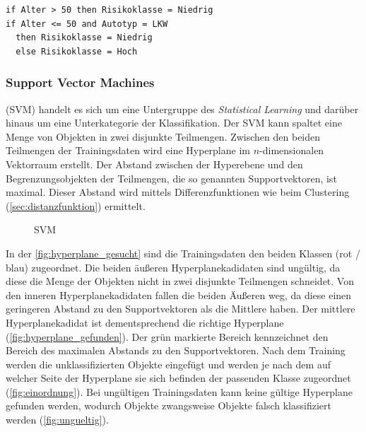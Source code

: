 \documentclass[12pt,journal,compsoc,ngerman]{IEEEtran}
\begin{document}
\begin{lstlisting}[caption={Entscheidungsbaum},label=list:dt,frame=single,floatplacement=t]
if Alter > 50 then Risikoklasse = Niedrig
if Alter <= 50 and Autotyp = LKW 
  then Risikoklasse = Niedrig
  else Risikoklasse = Hoch
\end{lstlisting}

\subsubsection{Support Vector Machines}
 (SVM) handelt es sich um eine Untergruppe des \emph{Statistical Learning} und darüber hinaus um eine Unterkategorie der Klassifikation. Der SVM kann spaltet eine Menge von Objekten in zwei disjunkte Teilmengen. Zwischen den beiden Teilmengen der Trainingsdaten wird eine Hyperplane im $n$-dimensionalen Vektorraum erstellt. Der Abstand zwischen der Hyperebene und den Begrenzungsobjekten der Teilmengen, die so genannten Supportvektoren, ist maximal. Dieser Abstand wird mittels Differenzfunktionen wie beim Clustering (\cref{sec:distanzfunktion}) ermittelt.

\begin{figure}[!t]
\centering
\subfigure[Gesucht]{\scalebox{0.42}{}\label{fig:hyperplane_gesucht}}
\subfigure[Gefunden]{\scalebox{0.42}{}\label{fig:hyperplane_gefunden}}
\subfigure[Einordnung]{\scalebox{0.49}{}\label{fig:einordnung}}
\caption{SVM}
\label{fig:svm}
\end{figure}

In der \cref{fig:hyperplane_gesucht} sind die Trainingsdaten den beiden Klassen (rot / blau) zugeordnet. Die beiden äußeren Hyperplanekadidaten sind ungültig, da diese die Menge der Objekten nicht in zwei disjunkte Teilmengen schneidet. Von den inneren Hyperplanekadidaten fallen die beiden Äußeren weg, da diese einen geringeren Abstand zu den Supportvektoren als die Mittlere haben. Der mittlere Hyperplanekadidat ist dementsprechend die richtige Hyperplane (\cref{fig:hyperplane_gefunden}). Der grün markierte Bereich kennzeichnet den Bereich des maximalen Abstands zu den Supportvektoren. Nach dem Training werden die unklassifizierten Objekte eingefügt und werden je nach dem auf welcher Seite der Hyperplane sie sich befinden der passenden Klasse zugeordnet (\cref{fig:einordnung}). Bei ungültigen Trainingsdaten kann keine gültige Hyperplane gefunden werden, wodurch Objekte zwangsweise Objekte falsch klassifiziert werden (\cref{fig:ungueltig}).
\end{document}
